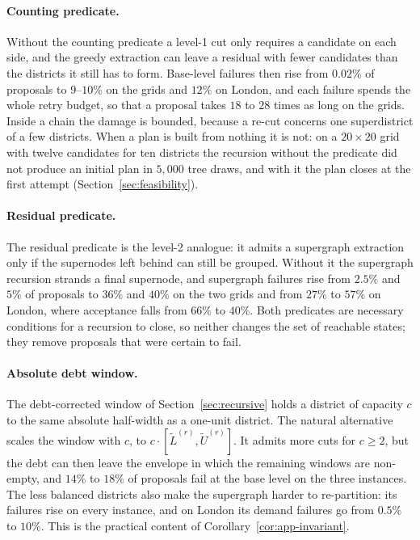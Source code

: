 \paragraph{Counting predicate.}
Without the counting predicate a level-1 cut only requires a candidate on each side, and the greedy extraction can leave a residual with fewer candidates than the districts it still has to form. Base-level failures then rise from $0.02\%$ of proposals to $9$--$10\%$ on the grids and $12\%$ on London, and each failure spends the whole retry budget, so that a proposal takes $18$ to $28$ times as long on the grids. Inside a chain the damage is bounded, because a re-cut concerns one superdistrict of a few districts. When a plan is built from nothing it is not: on a $20\times20$ grid with twelve candidates for ten districts the recursion without the predicate did not produce an initial plan in $5{,}000$ tree draws, and with it the plan closes at the first attempt (Section~\ref{sec:feasibility}).

\paragraph{Residual predicate.}
The residual predicate is the level-2 analogue: it admits a supergraph extraction only if the supernodes left behind can still be grouped. Without it the supergraph recursion strands a final supernode, and supergraph failures rise from $2.5\%$ and $5\%$ of proposals to $36\%$ and $40\%$ on the two grids and from $27\%$ to $57\%$ on London, where acceptance falls from $66\%$ to $40\%$. Both predicates are necessary conditions for a recursion to close, so neither changes the set of reachable states; they remove proposals that were certain to fail.

\paragraph{Absolute debt window.}
The debt-corrected window of Section~\ref{sec:recursive} holds a district of capacity $c$ to the same absolute half-width as a one-unit district. The natural alternative scales the window with $c$, to $c\cdot[\widetilde L^{(r)},\widetilde U^{(r)}]$. It admits more cuts for $c \ge 2$, but the debt can then leave the envelope in which the remaining windows are non-empty, and $14\%$ to $18\%$ of proposals fail at the base level on the three instances. The less balanced districts also make the supergraph harder to re-partition: its failures rise on every instance, and on London its demand failures go from $0.5\%$ to $10\%$. This is the practical content of Corollary~\ref{cor:app-invariant}.

